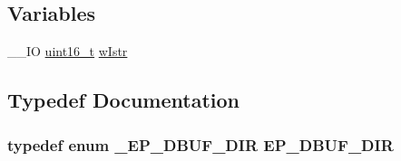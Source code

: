 \subsection*{Variables}
\begin{DoxyCompactItemize}
\item 
\-\_\-\-\_\-\-I\-O \hyperlink{stdint_8h_a273cf69d639a59973b6019625df33e30}{uint16\-\_\-t} \hyperlink{_s_t_m32_f30x_2_libraries_2_s_t_m32___u_s_b-_f_s-_device___driver_2inc_2usb__regs_8h_ada56371c653397fdfcb0bd55b7484071}{w\-Istr}
\end{DoxyCompactItemize}


\subsection{Typedef Documentation}
\hypertarget{_s_t_m32_f30x_2_libraries_2_s_t_m32___u_s_b-_f_s-_device___driver_2inc_2usb__regs_8h_abece26f40c007d1794916066fa950085}{
\subsubsection[{E\-P\-\_\-\-D\-B\-U\-F\-\_\-\-D\-I\-R}]{\setlength{\rightskip}{0pt plus 5cm}typedef enum {\bf \-\_\-\-E\-P\-\_\-\-D\-B\-U\-F\-\_\-\-D\-I\-R} {\bf E\-P\-\_\-\-D\-B\-U\-F\-\_\-\-D\-I\-R}}}\label{_s_t_m32_f30x_2_libraries_2_s_t_m32___u_s_b-_f_s-_device___driver_2inc_2usb__regs_8h_abece26f40c007d1794916066fa950085}


